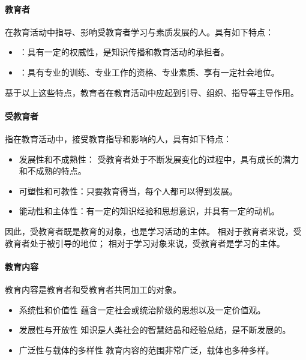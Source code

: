 \documentclass[b5paper,11pt]{article}
\begin{document}
\paragraph{教育者}
在教育活动中指导、影响受教育者学习与素质发展的人。具有如下特点：
\begin{itemize}
  \item {}：具有一定的权威性，是知识传播和教育活动的承担者。
  \item {}：具有专业的训练、专业工作的资格、专业素质、享有一定社会地位。
\end{itemize}
基于以上这些特点，教育者在教育活动中应起到\textcolor{ctp-red}{引导、组织、指导}等主导作用。

\paragraph{受教育者}
指在教育活动中，接受\textcolor{ctp-red}{教育指导和影响}的人，具有如下特点：
\begin{itemize}
  \item \textcolor{ctp-red}{发展性和不成熟性}： 受教育者处于不断发展变化的过程中，具有成长的潜力和不成熟的特点。
  \item \textcolor{ctp-red}{可塑性和可教性}：\textcolor{ctp-red}{只要教育得当，每个人都可以得到发展。}
  \item \textcolor{ctp-red}{能动性和主体性}：\textcolor{ctp-rosewater}{有一定的知识经验和思想意识}，并具有\textcolor{ctp-rosewater}{一定的动机。}
\end{itemize}

\vspace{0.6em}

因此，受教育者既是\textcolor{ctp-red}{教育的对象}，也是\textcolor{ctp-red}{学习活动的主体}。
相对于教育者来说，受教育者处于被引导的地位；
相对于学习对象来说，\textcolor{ctp-red}{受教育者是学习的主体}。

\paragraph{教育内容}
\textcolor{ctp-red}{教育内容是教育者和受教育者共同加工的对象。}

\begin{itemize}
  \item \textcolor{ctp-red}{系统性和价值性} 蕴含一定社会或统治阶级的思想以及一定价值观。
  \item \textcolor{ctp-red}{发展性与开放性} 知识是人类社会的智慧结晶和经验总结，是不断发展的。
  \item \textcolor{ctp-red}{广泛性与载体的多样性} 教育内容的范围非常广泛，载体也多种多样。
\end{itemize}
\end{document}
